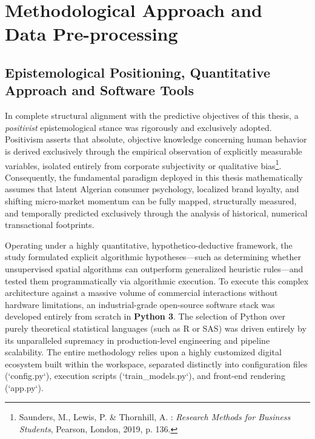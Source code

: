 \documentclass[12pt,a4paper]{report}
\begin{document}
\section{Methodological Approach and Data Pre-processing}

\subsection{Epistemological Positioning, Quantitative Approach and Software Tools}
In complete structural alignment with the predictive objectives of this thesis, a \textit{positivist} epistemological stance was rigorously and exclusively adopted. Positivism asserts that absolute, objective knowledge concerning human behavior is derived exclusively through the empirical observation of explicitly measurable variables, isolated entirely from corporate subjectivity or qualitative bias\footnote{Saunders, M., Lewis, P. \& Thornhill, A. : \textit{Research Methods for Business Students}, Pearson, London, 2019, p. 136.}. Consequently, the fundamental paradigm deployed in this thesis mathematically assumes that latent Algerian consumer psychology, localized brand loyalty, and shifting micro-market momentum can be fully mapped, structurally measured, and temporally predicted exclusively through the analysis of historical, numerical transactional footprints.

Operating under a highly quantitative, hypothetico-deductive framework, the study formulated explicit algorithmic hypotheses—such as determining whether unsupervised spatial algorithms can outperform generalized heuristic rules—and tested them programmatically via algorithmic execution. To execute this complex architecture against a massive volume of commercial interactions without hardware limitations, an industrial-grade open-source software stack was developed entirely from scratch in \textbf{Python 3}. The selection of Python over purely theoretical statistical languages (such as R or SAS) was driven entirely by its unparalleled supremacy in production-level engineering and pipeline scalability. The entire methodology relies upon a highly customized digital ecosystem built within the workspace, separated distinctly into configuration files (`config.py`), execution scripts (`train_models.py`), and front-end rendering (`app.py`).
\end{document}
